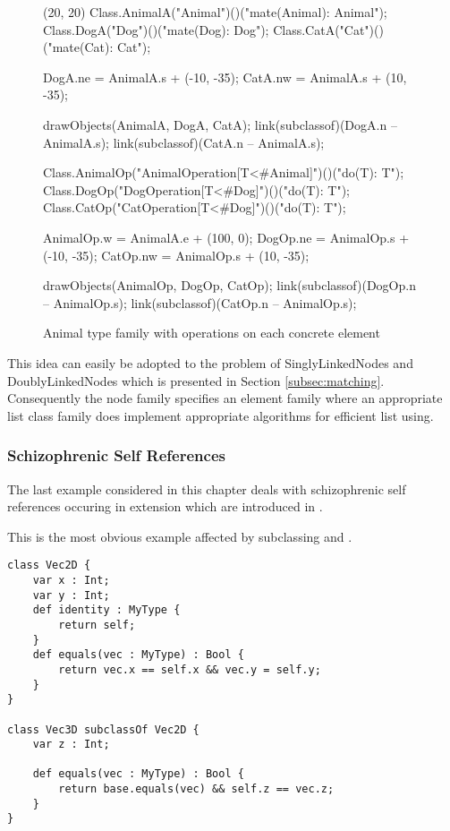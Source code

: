 \begin{figure}[H]
	\centering
	\begin{emp}[classdiag](20, 20)
		Class.AnimalA("Animal")()("mate(Animal): Animal");
		Class.DogA("Dog")()("mate(Dog): Dog");
		Class.CatA("Cat")()("mate(Cat): Cat");

		DogA.ne = AnimalA.s + (-10, -35);
		CatA.nw = AnimalA.s + (10, -35);

		drawObjects(AnimalA, DogA, CatA);
		link(subclassof)(DogA.n -- AnimalA.s);
		link(subclassof)(CatA.n -- AnimalA.s);

		Class.AnimalOp("AnimalOperation[T<#Animal]")()("do(T): T");
		Class.DogOp("DogOperation[T<#Dog]")()("do(T): T");
		Class.CatOp("CatOperation[T<#Dog]")()("do(T): T");

		AnimalOp.w = AnimalA.e + (100, 0);
		DogOp.ne = AnimalOp.s + (-10, -35);
		CatOp.nw = AnimalOp.s + (10, -35);

		drawObjects(AnimalOp, DogOp, CatOp);
		link(subclassof)(DogOp.n -- AnimalOp.s);
		link(subclassof)(CatOp.n -- AnimalOp.s);
	\end{emp}
	\caption{Animal type family with operations on each concrete element}
	\label{fig:operationFamily}
\end{figure}

This idea can easily be adopted to the problem of SinglyLinkedNodes
and DoublyLinkedNodes which is presented in Section
\ref{subsec:matching}. Consequently the node family specifies an element
family where an appropriate list class family does implement appropriate
algorithms for efficient list using.

\subsubsection{Schizophrenic Self References}
The last example considered in this chapter deals with schizophrenic self
references occuring in extension which are introduced in .

This is the most obvious example affected by subclassing and \mytype.

\begin{lstlisting}[float=ht,language=ooplss,caption=Avoid schizophrenic self references with \mytype.,label=lst:solveSchizo]
class Vec2D {
	var x : Int;
	var y : Int;
	def identity : MyType {
		return self;
	}
	def equals(vec : MyType) : Bool {
		return vec.x == self.x && vec.y = self.y;
	}
}

class Vec3D subclassOf Vec2D {
	var z : Int;

	def equals(vec : MyType) : Bool {
		return base.equals(vec) && self.z == vec.z;
	}
}
\end{lstlisting}

